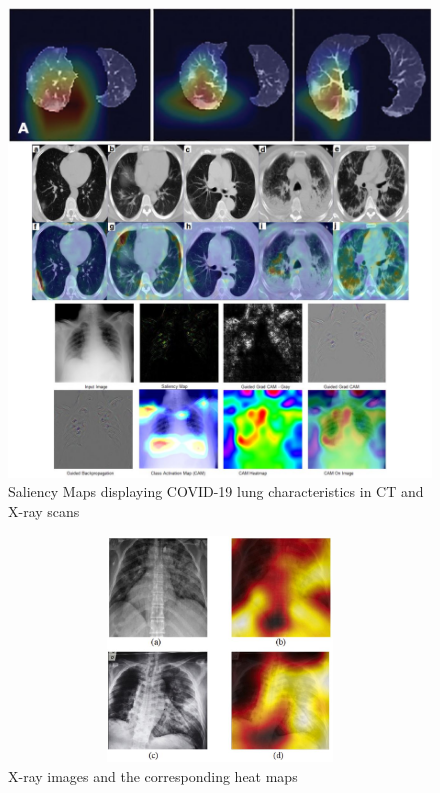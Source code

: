 \begin{figure}[H]
    \centering
    \includegraphics[width=15.5cm]{Images/Saliency Maps.png}
    \decoRule
    \caption[Attention Heat Map]{Saliency Maps displaying COVID-19 lung characteristics in CT and X-ray scans \cite{LLL+2020} \cite{GHT2020} \cite{HSX+2020}}
    \label{fig:Saliency Maps displaying COVID-19 lung characteristics in CT and X-ray scans}
    \end{figure}
    
\begin{figure}[H]
    \centering
    \includegraphics[width=15cm, height=6cm]{Images/Saliency4.JPG}
    \decoRule
    \caption[X-ray Heat Map]{X-ray images and the corresponding heat maps \cite{OTY+2020}}
    \label{fig:X-ray images and their corresponding heat maps}
    \end{figure}



